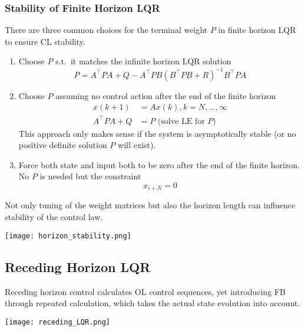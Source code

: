 \subsubsection{Stability of Finite Horizon LQR}
There are three common choices for the terminal weight $P$ in finite horizon LQR to ensure CL stability.
\begin{enumerate}
    \item Choose $P$ s.t.\ it matches the infinite horizon LQR solution
          \begin{equation*}
              P=A^\top PA+Q-A^\top PB{(B^\top PB+R)}^{-1}B^\top PA
          \end{equation*}
    \item Choose $P$ assuming no control action after the end of the finite horizon
          \begin{align*}
              x(k+1)        & =Ax(k),k=N,\dots ,\infty      \\
              A^{\top}PA +Q & = P\text{ (solve LE for $P$)}
          \end{align*}
          This approach only makes sense if the system is asymptotically stable (or no positive definite solution $P$ will exist).
    \item Force both state and input both to be zero after the end of the finite horizon. No $P$ is needed but the constraint
          \begin{equation*}
              x_{i+N} = 0
          \end{equation*}
\end{enumerate}

\newpar{}

Not only tuning of the weight matrices but also the horizon length can influence stability of the control law.

\begin{center}
    \texttt{[image: horizon\_stability.png]}
\end{center}

\subsection{Receding Horizon LQR}

Receding horizon control calculates OL control sequences, yet introducing FB through repeated calculation, which takes the actual state evolution into account.

\begin{center}
    \texttt{[image: receding\_LQR.png]}
\end{center}

